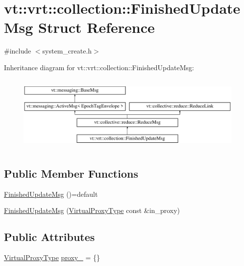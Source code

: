 \hypertarget{structvt_1_1vrt_1_1collection_1_1_finished_update_msg}{}\section{vt\+:\+:vrt\+:\+:collection\+:\+:Finished\+Update\+Msg Struct Reference}
\label{structvt_1_1vrt_1_1collection_1_1_finished_update_msg}


{\ttfamily \#include $<$system\+\_\+create.\+h$>$}

Inheritance diagram for vt\+:\+:vrt\+:\+:collection\+:\+:Finished\+Update\+Msg\+:\begin{figure}[H]
\begin{center}
\leavevmode
\includegraphics[height=3.796610cm]{structvt_1_1vrt_1_1collection_1_1_finished_update_msg}
\end{center}
\end{figure}
\subsection*{Public Member Functions}
\begin{DoxyCompactItemize}
\item 
\hyperlink{structvt_1_1vrt_1_1collection_1_1_finished_update_msg_a2388118a8c2f8b252df3b03a2fef2bdc}{Finished\+Update\+Msg} ()=default
\item 
\hyperlink{structvt_1_1vrt_1_1collection_1_1_finished_update_msg_a33f52bee58b70c60b29ef636118895a6}{Finished\+Update\+Msg} (\hyperlink{namespacevt_a1b417dd5d684f045bb58a0ede70045ac}{Virtual\+Proxy\+Type} const \&in\+\_\+proxy)
\end{DoxyCompactItemize}
\subsection*{Public Attributes}
\begin{DoxyCompactItemize}
\item 
\hyperlink{namespacevt_a1b417dd5d684f045bb58a0ede70045ac}{Virtual\+Proxy\+Type} \hyperlink{structvt_1_1vrt_1_1collection_1_1_finished_update_msg_a1058ef4d7be406b0cfa0eb768f7ec242}{proxy\+\_\+} = \{\}
\end{DoxyCompactItemize}
